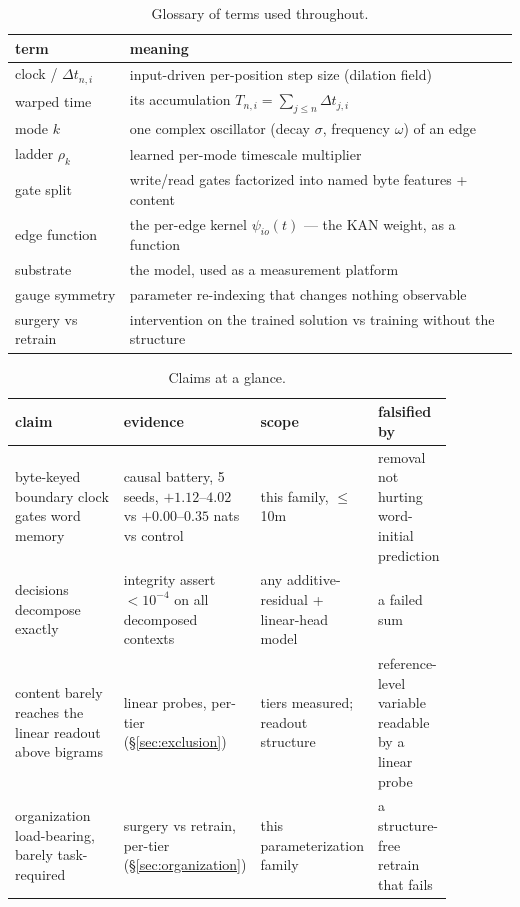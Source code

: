 \documentclass[11pt]{article}
\newcommand{\Dt}{\Delta t}
\begin{document}
\begin{table}[t]
\centering
\small
\begin{tabular}{ll}
\toprule
term & meaning \\
\midrule
clock / $\Dt_{n,i}$ & input-driven per-position step size (dilation field) \\
warped time & its accumulation $T_{n,i}=\sum_{j\le n}\Dt_{j,i}$ \\
mode $k$ & one complex oscillator (decay $\sigma$, frequency $\omega$) of an edge \\
ladder $\rho_k$ & learned per-mode timescale multiplier \\
gate split & write/read gates factorized into named byte features + content \\
edge function & the per-edge kernel $\psi_{io}(t)$ --- the KAN weight, as a function \\
substrate & the model, used as a measurement platform \\
gauge symmetry & parameter re-indexing that changes nothing observable \\
surgery vs retrain & intervention on the trained solution vs training without the structure \\
\bottomrule
\end{tabular}
\caption{Glossary of terms used throughout.}
\label{tab:glossary}
\end{table}

\begin{table}[t]
\centering
\small
\begin{tabular}{p{0.28\linewidth}p{0.25\linewidth}p{0.19\linewidth}p{0.15\linewidth}}
\toprule
claim & evidence & scope & falsified by \\
\midrule
byte-keyed boundary clock gates word memory &
causal battery, 5 seeds, $+1.12$--$4.02$ vs $+0.00$--$0.35$ nats vs control &
this family, $\le$10m &
removal not hurting word-initial prediction \\[2pt]
decisions decompose exactly &
integrity assert $<10^{-4}$ on all decomposed contexts &
any additive-residual + linear-head model &
a failed sum \\[2pt]
content barely reaches the linear readout above bigrams &
linear probes, per-tier (\S\ref{sec:exclusion}) &
tiers measured; readout structure &
reference-level variable readable by a linear probe \\[2pt]
organization load-bearing, barely task-required &
surgery vs retrain, per-tier (\S\ref{sec:organization}) &
this parameterization family &
a structure-free retrain that fails \\
\bottomrule
\end{tabular}
\caption{Claims at a glance.}
\label{tab:claims}
\end{table}
\end{document}
